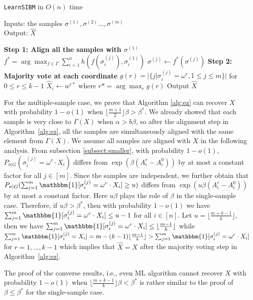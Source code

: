 \label{key}\documentclass[conference]{IEEEtran}
\begin{document}
		\begin{algorithm}
			\caption{\texttt{LearnSIBM} in $O(n)$ time} \label{alg:ez}
			Inputs: the samples $\sigma^{(1)},\sigma^{(2)}\dots,\sigma^{(m)}$ \\
			Output: $\hat{X}$
			\begin{algorithmic}[1]
				\Statex 
				{\bf Step 1: Align all the samples with $\sigma^{(1)}$ }
				\State $f^* = \arg\max_{f \in \Gamma} \sum_{i=1}^n h(f(\sigma^{(j)}_i), \sigma^{(1)}_i)$
				\State $\sigma^{(j)} \gets f^*(\sigma^{(j)})$
				\EndFor
				\Statex
				{\bf Step 2: Majority vote at each coordinate}
				\State $g(r) = |\{j | \sigma^{(j)}_i = \omega^r,1\leq j \leq m\}|$  for $ 0 \leq r \leq k-1$
				\State $\hat{X}_i \gets w^{r*}$ where $r*=\arg\max_r g(r)$
			\State{}
				\EndFor
				\State Output $\hat{X}$
			\end{algorithmic}
		\end{algorithm}
For the multiple-sample case,
we prove that Algorithm \ref{alg:ez} can recover $X$ with probability $1-o(1)$ when $\lfloor \frac{m+1}{2} \rfloor \beta>\beta^\ast$.
We already showed that each sample is very close to $\Gamma(X)$ when $\alpha > b \beta$,
so after the alignment step in Algorithm~\ref{alg:ez},
all the samples are simultaneously aligned with the same element from $\Gamma(X)$.
We assume all samples are aligned with $X$ in the following analysis.
From subsection \ref{subsect:smaller},
with probability $1-o(1)$, $P_{\sigma|G}(\sigma_i^{(j)}  = \omega^r \cdot X_i)$ differs from
$ \exp (\beta (A^r_i-A^0_i))$ by at most a constant factor for all $j\in[m]$.
Since the samples are independent,
we further obtain that $P_{\sigma|G}(\sum_{j=1}^m\mathbbm{1}[\sigma_i^{(j)}  = \omega^r \cdot X_i]\ge u)$ differs from
$ \exp ( u \beta (A^r_i-A^0_i))$
by at most a constant factor.
Here $u\beta$ plays the role of $\beta$ in the single-sample case.
Therefore, if $u\beta>\beta^\ast$, then with probability $1-o(1)$ we have $\sum_{j=1}^m\mathbbm{1}[\sigma_i^{(j)} = \omega^r \cdot X_i] \le u-1$ for all $i\in[n]$. Let $u=\lfloor \frac{m+k-1}{k} \rfloor$,
then we have $\sum_{j=1}^m\mathbbm{1}[\sigma_i^{(j)}  = \omega^r \cdot X_i] \le \lfloor \frac{m-1}{k} \rfloor $
while $\sum_{j=1}^m\mathbbm{1}[\sigma_i^{(j)} = X_i]
= m - (k-1)\lfloor \frac{m-1}{k} \rfloor > \sum_{j=1}^m\mathbbm{1}[\sigma_i^{(j)}  = \omega^r \cdot X_i] $ for $r=1, \dots, k-1$
which implies that $\hat{X}=X$ after the majority voting step in Algorithm~\ref{alg:ez}.

The proof of the converse results, i.e., even ML algorithm cannot recover $X$ with probability $1-o(1)$ when
$\lfloor \frac{m+k-1}{k} \rfloor  \beta < \beta^\ast$ is rather similar to the proof of $\beta\le\beta^\ast$ for the single-sample case.



\end{document}
